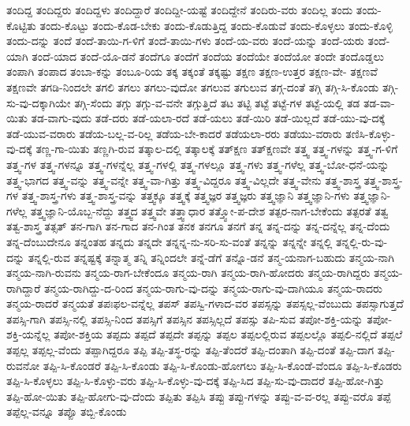 {ತಂದಿದ್ದ
ತಂದಿದ್ದರು
ತಂದಿದ್ದಳು
ತಂದಿದ್ದಾರೆ
ತಂದಿದ್ದೀ-ಯಷ್ಟೆ
ತಂದಿದ್ದೇನೆ
ತಂದಿರು-ವರು
ತಂದಿಲ್ಲ
ತಂದು
ತಂದು-ಕೊಟ್ಟಿತು
ತಂದು-ಕೊಟ್ಟು
ತಂದು-ಕೊಡ-ಬೇಕು
ತಂದು-ಕೊಡುತ್ತಿದ್ದ
ತಂದು-ಕೊಡುವೆ
ತಂದು-ಕೊಳ್ಳಲು
ತಂದು-ಕೊಳ್ಳಿ
ತಂದು-ದನ್ನು
ತಂದೆ
ತಂದೆ-ತಾಯಿ-ಗ-ಳಿಗೆ
ತಂದೆ-ತಾಯಿ-ಗಳು
ತಂದೆ-ಯ-ವರು
ತಂದೆ-ಯನ್ನು
ತಂದೆ-ಯರು
ತಂದೆ-ಯಾಗಿ
ತಂದೆ-ಯಾದ
ತಂದೆ-ಯೊ-ಡನೆ
ತಂದೆಗೂ
ತಂದೆಗೆ
ತಂದೆಯ
ತಂದೆಯೇ
ತಂದೆಯೋ
ತಂದೇ
ತಂದೊಡ್ಡಲು
ತಂಪಾಗಿ
ತಂಪಾದ
ತಂಬಾ-ಕನ್ನು
ತಂಬೂ-ರಿಯ
ತಕ್ಕ
ತಕ್ಕಂತೆ
ತಕ್ಕಷ್ಟು
ತಕ್ಷಣ
ತಕ್ಷಣ-ಉತ್ತರ
ತಕ್ಷಣ-ವೇ-
ತಕ್ಷಣವೆ
ತಕ್ಷಣವೇ
ತಗಡಿ-ನಿಂದಲೇ
ತಗಲಿ
ತಗಲು
ತಗಲು-ವುದೋ
ತಗಲುವ
ತಗುಲುವ
ತಗ್ಗ-ದಂತೆ
ತಗ್ಗಿ
ತಗ್ಗಿ-ಸಿ-ಕೊಂಡು
ತಗ್ಗಿ-ಸು-ವು-ದಕ್ಕಾಗಿಯೇ
ತಗ್ಗಿ-ಸೆಂದು
ತಗ್ಗು
ತಗ್ಗು-ವ-ವನೇ
ತಗ್ಗುತ್ತಿದೆ
ತಟ
ತಟ್ಟಿ
ತಟ್ಟೆ
ತಟ್ಟೆ-ಗಳ
ತಟ್ಟೆ-ಯಲ್ಲಿ
ತಡ
ತಡ-ವಾ-ಯಿತು
ತಡ-ವಾಗು-ವುದು
ತಡೆ-ದರು
ತಡೆ-ಯಲಾ-ರದೆ
ತಡೆ-ಯಲು
ತಡೆ-ಯಿರಿ
ತಡೆ-ಯಿಲ್ಲದೆ
ತಡೆ-ಯು-ವು-ದಕ್ಕೆ
ತಡೆ-ಯುವ-ವರಾರು
ತಡೆಯ-ಬಲ್ಲ-ವ-ರಿಲ್ಲ
ತಡೆಯ-ಬೇ-ಕಾದರೆ
ತಡೆಯಲಾ-ರರು
ತಡೆಯು-ವರಾರು
ತಣಿಸಿ-ಕೊಳ್ಳು-ವು-ದಕ್ಕೆ
ತಣ್ಣ-ಗಾ-ಯಿತು
ತಣ್ಣಗಿ-ರುವ
ತತ್ಕಾಲ-ದಲ್ಲಿ
ತತ್ಕಾಲಕ್ಕೆ
ತತ್ಕ್ಷಣ
ತತ್ಕ್ಷಣವೇ
ತತ್ತ್ವ
ತತ್ತ್ವ-ಗಳನ್ನು
ತತ್ತ್ವ-ಗ-ಳಿಗೆ
ತತ್ತ್ವ-ಗಳ
ತತ್ತ್ವ-ಗಳನ್ನೂ
ತತ್ತ್ವ-ಗಳನ್ನೆಲ್ಲ
ತತ್ತ್ವ-ಗಳಲ್ಲಿ
ತತ್ತ್ವ-ಗಳಲ್ಲೂ
ತತ್ತ್ವ-ಗಳು
ತತ್ತ್ವ-ಗಳೆಲ್ಲ
ತತ್ತ್ವ-ಬೋ-ಧನೆ-ಯನ್ನು
ತತ್ತ್ವ-ಭಾಗದ
ತತ್ತ್ವ-ವನ್ನು
ತತ್ತ್ವ-ವನ್ನೇ
ತತ್ತ್ವ-ವಾ-ಗಿತ್ತು
ತತ್ತ್ವ-ವಿದ್ದರೂ
ತತ್ತ್ವ-ವಿಲ್ಲದೇ
ತತ್ತ್ವ-ವೇನು
ತತ್ತ್ವ-ಶಾಸ್ತ್ರ
ತತ್ತ್ವ-ಶಾಸ್ತ್ರ-ಗಳ
ತತ್ತ್ವ-ಶಾಸ್ತ್ರ-ಗಳು
ತತ್ತ್ವ-ಶಾಸ್ತ್ರ-ವನ್ನು
ತತ್ತ್ವಕ್ಕೂ
ತತ್ತ್ವಕ್ಕೆ
ತತ್ತ್ವಜ್ಞರ
ತತ್ತ್ವಜ್ಞರು
ತತ್ತ್ವಜ್ಞಾನಿ
ತತ್ತ್ವಜ್ಞಾನಿ-ಗಳು
ತತ್ತ್ವಜ್ಞಾನಿ-ಗಳೆಲ್ಲ
ತತ್ತ್ವಜ್ಞಾನಿ-ಯೊಬ್ಬ-ನೆದ್ದು
ತತ್ತ್ವದ
ತತ್ತ್ವವೇ
ತತ್ತ್ವಾಧಾರ
ತತ್ತ್ವೋ-ಪ-ದೇಶ
ತತ್ಪರ-ನಾಗ-ಬೇಕೆಂದು
ತತ್ಪರತೆ
ತತ್ವ
ತತ್ವ-ಶಾಸ್ತ್ರ
ತತ್ಸತ್
ತನ-ಗಾಗಿ
ತನ-ಗಾದ
ತನ-ಗಿಂತ
ತನಕ
ತನಗೂ
ತನಗೆ
ತನ್ನ
ತನ್ನ-ದನ್ನು
ತನ್ನ-ದನ್ನೆಲ್ಲ
ತನ್ನ-ದೆಂದು
ತನ್ನ-ದೆಂಬುದೇನೂ
ತನ್ನಂತಹ
ತನ್ನದು
ತನ್ನದೇ
ತನ್ನನ್ನ-ನು-ಸರಿ-ಸು-ವಂತೆ
ತನ್ನನ್ನು
ತನ್ನನ್ನೇ
ತನ್ನಲ್ಲಿ
ತನ್ನಲ್ಲಿ-ರು-ವು-ದನ್ನು
ತನ್ನಲ್ಲಿ-ರುವ
ತನ್ನಷ್ಟಕ್ಕೆ
ತನ್ನಾತ್ಮ
ತನ್ನಿ
ತನ್ನಿಂದಲೇ
ತನ್ನೆ-ಡೆಗೆ
ತನ್ನೊ-ಡನೆ
ತನ್ಮ-ಯನಾಗ-ಬಹುದು
ತನ್ಮಯ-ನಾಗಿ
ತನ್ಮಯ-ನಾಗಿ-ರುವನು
ತನ್ಮಯ-ರಾಗ-ಬೇಕೆಂದೂ
ತನ್ಮಯ-ರಾಗಿ
ತನ್ಮಯ-ರಾಗಿ-ಹೋದರು
ತನ್ಮಯ-ರಾಗಿದ್ದರು
ತನ್ಮಯ-ರಾಗಿದ್ದಾರೆ
ತನ್ಮಯ-ರಾಗಿದ್ದು-ದ-ರಿಂದ
ತನ್ಮಯ-ರಾಗು-ವು-ದನ್ನು
ತನ್ಮಯ-ರಾಗು-ವು-ದಾಗಿಯೂ
ತನ್ಮಯ-ರಾದರು
ತನ್ಮಯ-ರಾದರೆ
ತನ್ಮಯತೆ
ತಪಃಫಲ-ವನ್ನೆಲ್ಲ
ತಪಸ್
ತಪಸ್ವಿ-ಗಳಾದ-ವರ
ತಪಸ್ಸನ್ನು
ತಪಸ್ಸಲ್ಲ-ವೆಂಬುದು
ತಪಸ್ಸಾಗುತ್ತದೆ
ತಪಸ್ಸಿ-ಗಾಗಿ
ತಪಸ್ಸಿ-ನಲ್ಲಿ
ತಪಸ್ಸಿ-ನಿಂದ
ತಪಸ್ಸಿಗೆ
ತಪಸ್ಸಿನ
ತಪಸ್ಸಿಲ್ಲದೆ
ತಪಸ್ಸು
ತಪಿ-ಸುವ
ತಪೋ-ಶಕ್ತಿ-ಯನ್ನು
ತಪೋ-ಶಕ್ತಿ-ಯನ್ನೆಲ್ಲ
ತಪೋ-ಶಕ್ತಿಯ
ತಪ್ಪದು
ತಪ್ಪದೆ
ತಪ್ಪದೇ
ತಪ್ಪನ್ನು
ತಪ್ಪಲ
ತಪ್ಪಲಲ್ಲಿರುವ
ತಪ್ಪಲಲ್ಲೊ
ತಪ್ಪಲಿ-ನಲ್ಲಿದೆ
ತಪ್ಪಲೆ
ತಪ್ಪಲ್ಲ
ತಪ್ಪಲ್ಲ-ವೆಂದು
ತಪ್ಪಾಗಿದ್ದರೂ
ತಪ್ಪಿ
ತಪ್ಪಿ-ತಸ್ಥ-ರನ್ನು
ತಪ್ಪಿ-ತೆಂದರೆ
ತಪ್ಪಿ-ದಂತಾಗಿ
ತಪ್ಪಿ-ದಂತೆ
ತಪ್ಪಿ-ದಾಗ
ತಪ್ಪಿ-ರುವನೋ
ತಪ್ಪಿ-ಸಿ-ಕೊಂಡರೆ
ತಪ್ಪಿ-ಸಿ-ಕೊಂಡು
ತಪ್ಪಿ-ಸಿ-ಕೊಂಡು-ಹೋಗಲು
ತಪ್ಪಿ-ಸಿ-ಕೊಂಡೆ-ವೆಂದೂ
ತಪ್ಪಿ-ಸಿ-ಕೊಡರು
ತಪ್ಪಿ-ಸಿ-ಕೊಳ್ಳಲು
ತಪ್ಪಿ-ಸಿ-ಕೊಳ್ಳು-ವರು
ತಪ್ಪಿ-ಸಿ-ಕೊಳ್ಳು-ವು-ದಕ್ಕೆ
ತಪ್ಪಿ-ಸಿದ
ತಪ್ಪಿ-ಸು-ವು-ದಾದರೆ
ತಪ್ಪಿ-ಹೋ-ಗಿತ್ತು
ತಪ್ಪಿ-ಹೋ-ಯಿತು
ತಪ್ಪಿ-ಹೋಗು-ವು-ದೆಂದು
ತಪ್ಪಿತು
ತಪ್ಪಿಸಿ
ತಪ್ಪು
ತಪ್ಪು-ಗಳನ್ನು
ತಪ್ಪು-ವ-ವ-ರಲ್ಲ
ತಪ್ಪು-ವರೊ
ತಪ್ಪೆ
ತಪ್ಪೆಲ್ಲ-ವನ್ನೂ
ತಪ್ಪೊ
ತಬ್ಬಿ-ಕೊಂಡು
}
